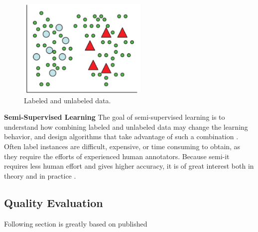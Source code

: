 \documentclass{mini}
\begin{document}
\begin{figure}
  \begin{center}
    \includegraphics[width=0.55\textwidth]{images/semi_supervised_graph.png}
  \end{center}
  \caption{Labeled and unlabeled data.}
  \label{fig:handwritten_ex}
\end{figure}

\textbf{Semi-Supervised Learning} The goal of semi-supervised learning is to understand how combining labeled and unlabeled data may change the learning behavior, and design algorithms that take advantage of such a combination \cite{semi_supervised}. Often label instances are difficult, expensive, or time consuming to obtain, as they require the efforts of experienced human annotators. Because semi-it requires less human effort and gives higher accuracy, it is of great interest both in theory and in practice \cite{semi_supervised2}.


\pagebreak
\paragraph{}
\subsection{Quality Evaluation}\label{evaluation}
Following section is greatly based on published 
\end{document}
